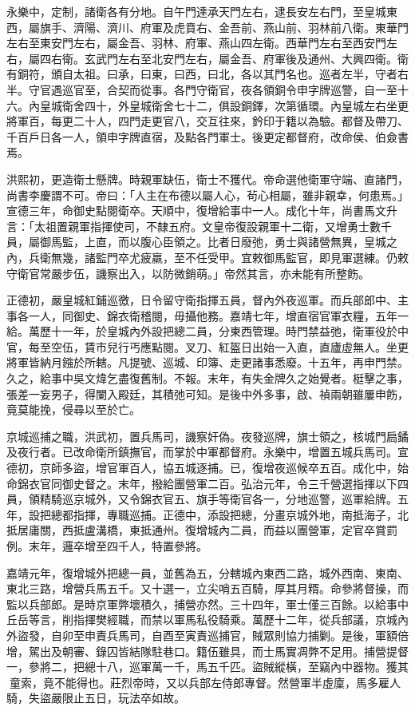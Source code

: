 永樂中，定制，諸衛各有分地。自午門達承天門左右，逮長安左右門，至皇城東西，屬旗手、濟陽、濟川、府軍及虎賁右、金吾前、燕山前、羽林前八衛。東華門左右至東安門左右，屬金吾、羽林、府軍、燕山四左衛。西華門左右至西安門左右，屬四右衛。玄武門左右至北安門左右，屬金吾、府軍後及通州、大興四衛。衛有銅符，頒自太祖。曰承，曰東，曰西，曰北，各以其門名也。巡者左半，守者右半。守官遇巡官至，合契而從事。各門守衛官，夜各領銅令申字牌巡警，自一至十六。內皇城衛舍四十，外皇城衛舍七十二，俱設銅鐸，次第循環。內皇城左右坐更將軍百，每更二十人，四門走更官八，交互往來，鈐印于籍以為驗。都督及帶刀、千百戶日各一人，領申字牌直宿，及點各門軍士。後更定都督府，改命侯、伯僉書焉。

洪熙初，更造衛士懸牌。時親軍缺伍，衛士不獲代。帝命選他衛軍守端、直諸門，尚書李慶謂不可。帝曰：「人主在布德以屬人心，茍心相屬，雖非親幸，何患焉。」宣德三年，命御史點閱衛卒。天順中，復增給事中一人。成化十年，尚書馬文升言：「太祖置親軍指揮使司，不隸五府。文皇帝復設親軍十二衛，又增勇士數千員，屬御馬監，上直，而以腹心臣領之。比者日廢弛，勇士與諸營無異，皇城之內，兵衛無幾，諸監門卒尤疲羸，至不任受甲。宜敕御馬監官，即見軍選練。仍敕守衛官常嚴步伍，譏察出入，以防微銷萌。」帝然其言，亦未能有所整飭。

正德初，嚴皇城紅鋪巡徼，日令留守衛指揮五員，督內外夜巡軍。而兵部郎中、主事各一人，同御史、錦衣衛稽閱，毋攝他務。嘉靖七年，增直宿官軍衣糧，五年一給。萬歷十一年，於皇城內外設把總二員，分東西管理。時門禁益弛，衛軍役於中官，每至空伍，賃市兒行丐應點閱。叉刀、紅盔日出始一入直，直廬虛無人。坐更將軍皆納月鏹於所轄。凡提號、巡城、印簿、走更諸事悉廢。十五年，再申門禁。久之，給事中吳文煒乞盡復舊制。不報。末年，有失金牌久之始覺者。梃擊之事，張差一妄男子，得闌入殿廷，其積弛可知。是後中外多事，啟、禎兩朝雖屢申飭，竟莫能挽，侵尋以至於亡。

京城巡捕之職，洪武初，置兵馬司，譏察奸偽。夜發巡牌，旗士領之，核城門扃鐍及夜行者。已改命衛所鎮撫官，而掌於中軍都督府。永樂中，增置五城兵馬司。宣德初，京師多盜，增官軍百人，協五城逐捕。已，復增夜巡候卒五百。成化中，始命錦衣官同御史督之。末年，撥給團營軍二百。弘治元年，令三千營選指揮以下四員，領精騎巡京城外，又令錦衣官五、旗手等衛官各一，分地巡警，巡軍給牌。五年，設把總都指揮，專職巡捕。正德中，添設把總，分畫京城外地，南抵海子，北抵居庸關，西抵盧溝橋，東抵通州。復增城內二員，而益以團營軍，定官卒賞罰例。末年，邏卒增至四千人，特置參將。

嘉靖元年，復增城外把總一員，並舊為五，分轄城內東西二路，城外西南、東南、東北三路，增營兵馬五千。又十選一，立尖哨五百騎，厚其月糈。命參將督操，而監以兵部郎。是時京軍弊壞積久，捕營亦然。三十四年，軍士僅三百餘。以給事中丘岳等言，削指揮樊經職，而禁以軍馬私役騎乘。萬歷十二年，從兵部議，京城內外盜發，自卯至申責兵馬司，自酉至寅責巡捕官，賊眾則協力捕剿。是後，軍額倍增，駕出及朝審、錄囚皆結隊駐巷口。籍伍雖具，而士馬實凋弊不足用。捕營提督一，參將二，把總十八，巡軍萬一千，馬五千匹。盜賊縱橫，至竊內中器物。獲其童索，竟不能得也。莊烈帝時，又以兵部左侍郎專督。然營軍半虛廩，馬多雇人騎，失盜嚴限止五日，玩法卒如故。

